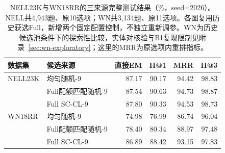 \begin{table}[htbp]
\caption{NELL23K与WN18RR的三来源完整测试结果（\%，seed=2026）。NELL共4,943题、原10选项；WN共3,134题、原11选项。各图复用历史获选Full，新增两个固定配置控制，不独立重新调参。WN为历史候选池条件下的探索性比较，实体对核验与B1复现限制见附录~\ref{sec:wn-exploratory}；这里的MRR为原选项内重排指标。}
\label{tab:cross-dataset-sources}
\centering\small
\begin{tabular}{llrrrr}
\toprule
数据集 & 候选来源 & 直接EM & H@1 & MRR & H@3 \\
\midrule
NELL23K & 均匀随机-9 & 87.17 & 90.17 & 94.42 & 98.83 \\
 & Full配额匹配随机-9 & 87.54 & 90.63 & 94.73 & 98.87 \\
 & Full SC-CL-9 & 87.80 & 90.33 & 94.53 & 98.73 \\
WN18RR & 均匀随机-9 & 74.98 & 76.99 & 86.74 & 96.04 \\
 & Full配额匹配随机-9 & 78.40 & 80.34 & 88.97 & 97.48 \\
 & Full SC-CL-9 & 86.89 & 88.42 & 93.15 & 97.83 \\
\bottomrule
\end{tabular}
\end{table}
